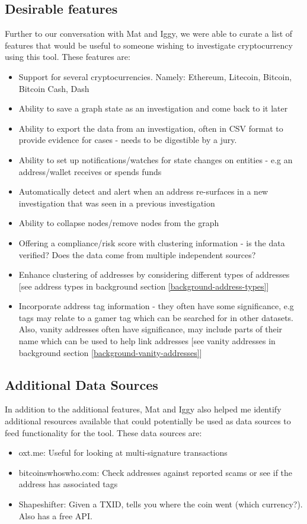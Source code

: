 \subsection{Desirable features}
Further to our conversation with Mat and Iggy, we were able to curate a list of features that would be useful to someone wishing to investigate cryptocurrency using this tool. These features are:
\begin{itemize}
    \item Support for several cryptocurrencies. Namely: Ethereum, Litecoin, Bitcoin, Bitcoin Cash, Dash
    \item Ability to save a graph state as an investigation and come back to it later
    \item Ability to export the data from an investigation, often in CSV format to provide evidence for cases - needs to be digestible by a jury.
    \item Ability to set up notifications/watches for state changes on entities - e.g an address/wallet receives or spends funds 
    \item Automatically detect and alert when an address re-surfaces in a new investigation that was seen in a previous investigation 
    \item Ability to collapse nodes/remove nodes from the graph 
    \item Offering a compliance/risk score with clustering information - is the data verified? Does the data come from multiple independent sources? 
    \item Enhance clustering of addresses by considering different types of addresses [see address types in background section \ref{background-address-types}]
    \item Incorporate address tag information - they often have some significance, e.g tags may relate to a gamer tag which can be searched for in other datasets. Also, vanity addresses often have significance, may include parts of their name which can be used to help link addresses [see vanity addresses in background section \ref{background-vanity-addresses}]
\end{itemize}

\subsection{Additional Data Sources}
In addition to the additional features, Mat and Iggy also helped me identify additional resources available that could potentially be used as data sources to feed functionality for the tool. These data sources are:
\begin{itemize}
    \item oxt.me: Useful for looking at multi-signature transactions
    \item bitcoinswhoswho.com: Check addresses against reported scams or see if the address has associated tags
    \item Shapeshifter: Given a TXID, tells you where the coin went (which currency?). Also has a free API.
\end{itemize}

